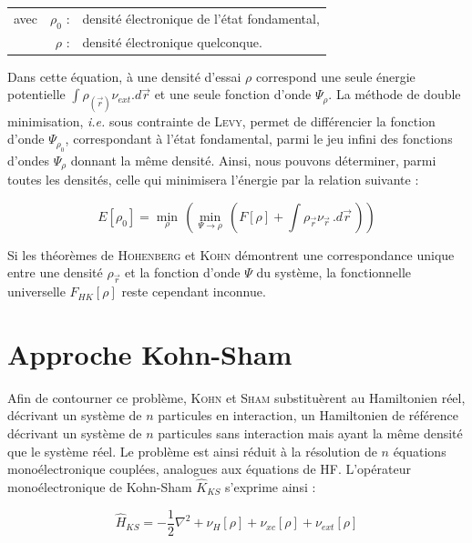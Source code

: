 \begin{flushleft}
\begin{tabular}{@{}lrp{10cm}}
avec & $\rho_{0}$ : & densité électronique de l'état fondamental, \\
& $\rho$ : & densité électronique quelconque.
\end{tabular}
\end{flushleft}

Dans cette équation, à une densité d'essai $\rho$ correspond une seule énergie potentielle $\int \rho_{(\vec{r})} \nu_{ext} .d\vec{r}$ et une seule fonction d'onde $\Psi_{\rho}$. La méthode de double minimisation, \textit{i.e.} sous contrainte de \textsc{Levy}, permet de différencier la fonction d'onde $\Psi_{\rho_{0}}$, correspondant à l'état fondamental, parmi le jeu infini des fonctions d'ondes $\Psi_{\rho}$ donnant la même densité. Ainsi, nous pouvons déterminer, parmi toutes les densités, celle qui minimisera l'énergie par la relation suivante :

\begin{equation}
E[\rho_{0}] = \min\limits_{\rho}\, (\min\limits_{\Psi\rightarrow\rho}\, (F[\rho] + \int \rho_{\vec{r}} \nu_{\vec{r}}\, .d\vec{r}\, ))
\end{equation}

Si les théorèmes de \textsc{Hohenberg} et \textsc{Kohn} démontrent une correspondance unique entre une densité $\rho_{\vec{r}}$ et la fonction d'onde $\Psi$ du système, la fonctionnelle universelle $F_{HK}[\rho]$ reste cependant inconnue.

\section{Approche Kohn-Sham}\label{Kohn-Sham}

Afin de contourner ce problème, \textsc{Kohn} et \textsc{Sham} substituèrent au Hamiltonien réel, décrivant un système de $n$ particules en interaction, un Hamiltonien de référence décrivant un système de $n$ particules sans interaction mais ayant la même densité que le système réel. Le problème est ainsi réduit à la résolution de $n$ équations monoélectronique couplées, analogues aux équations de HF. L'opérateur monoélectronique de Kohn-Sham $\hat{K}_{KS}$ s'exprime ainsi :

\begin{equation}
\hat{H}_{KS} = -\frac{1}{2} \nabla^{2} + \nu_{H}[\rho] + \nu_{xc}[\rho] + \nu_{ext}[\rho]
\end{equation}

